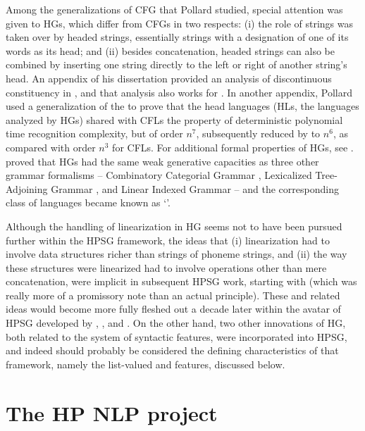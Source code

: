 \documentclass[output=paper
                ,modfonts
                ,nonflat
	        ,collection
	        ,collectionchapter
	        ,collectiontoclongg
 	        ,biblatex
                ,babelshorthands
                ,newtxmath
                ,draftmode
                ,colorlinks, citecolor=brown
]{./langsci/langscibook}
\begin{document}
Among the generalizations of CFG that Pollard studied, special attention was given to HGs, which differ from CFGs in two respects: (i) the role of strings was taken over by headed strings, essentially strings with a designation of one of its words as its head; and (ii) besides concatenation, headed strings can also be combined by inserting one string directly to the left or right of another string's head. An appendix of his dissertation \citep{Pollard84a-u} provided an analysis of discontinuous constituency in , and that analysis also works for . In another appendix, Pollard used a generalization of the  to prove that the head languages (HLs, the languages analyzed by HGs) shared with CFLs the property of deterministic polynomial time recognition complexity, but of order $n^{7}$, subsequently reduced by \citet*{Kasamietal1989} to $n^{6}$, as compared with order $n^{3}$ for CFLs. For additional formal properties of HGs, see \citet{Roach1987}. \citet{VijayWeir1994} proved that HGs had the same weak generative capacities as three other grammar formalisms -- Combinatory Categorial Grammar \citep{Steedman87a-u,Steedman90a-u}, Lexicalized Tree-Adjoining Grammar \citep{Shabes90}, and Linear Indexed Grammar \citep{Gazdar88a-u} -- and the corresponding class of languages became known as `'.

Although the handling of linearization in HG seems not to have been pursued further within the HPSG framework, the ideas that (i) linearization had to involve data structures richer than strings of phoneme strings, and (ii) the way these structures were linearized had to involve operations other than mere concatenation, were implicit in subsequent HPSG work, starting with   (which was really more of a promissory note than an actual principle).  These and related ideas would become more fully fleshed out a decade later within the  avatar of HPSG developed by \citet{Reape90a}, \citet{Reape92a}, and \citet{Kathol95a,Kathol2000a}. On the other hand, two other innovations of HG, both related to the system of syntactic features, were incorporated into HPSG, and indeed should probably be considered the defining characteristics of that framework, namely the list-valued \subcat and \slasch features, discussed below.


\section{The HP NLP project}
\end{document}
